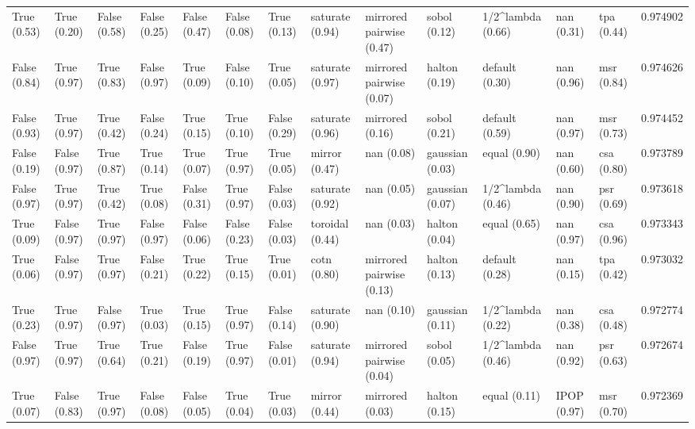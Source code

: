 \begin{tabular}{lllllllllllllr}
True (0.53) & True (0.20) & False (0.58) & False (0.25) & False (0.47) & False (0.08) & True (0.13) & saturate (0.94) & mirrored pairwise (0.47) & sobol (0.12) & 1/2^lambda (0.66) & nan (0.31) & tpa (0.44) & 0.974902 \\
False (0.84) & True (0.97) & True (0.83) & False (0.97) & True (0.09) & False (0.10) & True (0.05) & saturate (0.97) & mirrored pairwise (0.07) & halton (0.19) & default (0.30) & nan (0.96) & msr (0.84) & 0.974626 \\
False (0.93) & True (0.97) & True (0.42) & False (0.24) & True (0.15) & True (0.10) & False (0.29) & saturate (0.96) & mirrored (0.16) & sobol (0.21) & default (0.59) & nan (0.97) & msr (0.73) & 0.974452 \\
False (0.19) & False (0.97) & True (0.87) & True (0.14) & True (0.07) & True (0.97) & True (0.05) & mirror (0.47) & nan (0.08) & gaussian (0.03) & equal (0.90) & nan (0.60) & csa (0.80) & 0.973789 \\
False (0.97) & True (0.97) & True (0.42) & True (0.08) & False (0.31) & True (0.97) & False (0.03) & saturate (0.92) & nan (0.05) & gaussian (0.07) & 1/2^lambda (0.46) & nan (0.90) & psr (0.69) & 0.973618 \\
True (0.09) & False (0.97) & True (0.97) & False (0.97) & False (0.06) & False (0.23) & False (0.03) & toroidal (0.44) & nan (0.03) & halton (0.04) & equal (0.65) & nan (0.97) & csa (0.96) & 0.973343 \\
True (0.06) & False (0.97) & True (0.97) & False (0.21) & True (0.22) & True (0.15) & True (0.01) & cotn (0.80) & mirrored pairwise (0.13) & halton (0.13) & default (0.28) & nan (0.15) & tpa (0.42) & 0.973032 \\
True (0.23) & True (0.97) & False (0.97) & True (0.03) & True (0.15) & True (0.97) & False (0.14) & saturate (0.90) & nan (0.10) & gaussian (0.11) & 1/2^lambda (0.22) & nan (0.38) & csa (0.48) & 0.972774 \\
False (0.97) & True (0.97) & True (0.64) & True (0.21) & False (0.19) & True (0.97) & False (0.01) & saturate (0.94) & mirrored pairwise (0.04) & sobol (0.05) & 1/2^lambda (0.46) & nan (0.92) & psr (0.63) & 0.972674 \\
True (0.07) & False (0.83) & True (0.97) & False (0.08) & False (0.05) & True (0.04) & True (0.03) & mirror (0.44) & mirrored (0.03) & halton (0.15) & equal (0.11) & IPOP (0.97) & msr (0.70) & 0.972369 \\
\bottomrule
\end{tabular}
